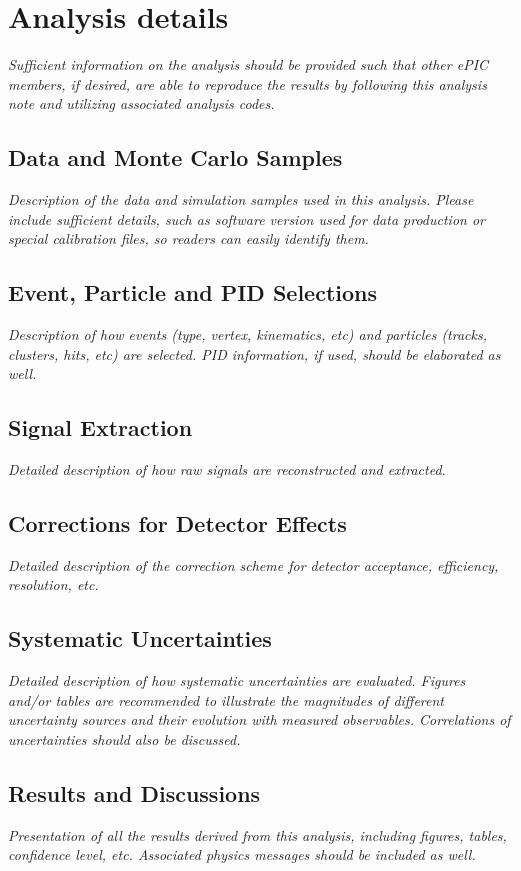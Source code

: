 \section{Analysis details}\label{sec:report}
\textit{Sufficient information on the analysis should be provided such that other ePIC members, if desired, are able to reproduce the results by following this analysis note and utilizing associated analysis codes. }

\subsection{Data and Monte Carlo Samples}
\textit{Description of the data and simulation samples used in this analysis. Please include sufficient details, such as software version used for data production or special calibration files, so readers can easily identify them.}

\subsection{Event, Particle and PID Selections}
\textit{Description of how events (type, vertex, kinematics, etc) and particles (tracks, clusters, hits, etc) are selected. PID information, if used, should be elaborated as well.}

\subsection{Signal Extraction}
\textit{Detailed description of how raw signals are reconstructed and extracted.}

\subsection{Corrections for Detector Effects}
\textit{Detailed description of the correction scheme for detector acceptance, efficiency, resolution, etc.}

\subsection{Systematic Uncertainties}
\textit{Detailed description of how systematic uncertainties are evaluated. Figures and/or tables are recommended to illustrate the magnitudes of different uncertainty sources and their evolution with measured observables. Correlations of uncertainties should also be discussed.}

\subsection{Results and Discussions}
\textit{Presentation of all the results derived from this analysis, including figures, tables, confidence level, etc. Associated physics messages should be included as well. }

